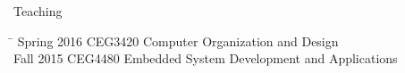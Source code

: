 
\begin{rSection}{Teaching}
\begin{tabbing}
\hspace{1.0in}\= \kill
    Spring 2016  \>  CEG3420 Computer Organization and Design \\
    Fall 2015    \>  CEG4480 Embedded System Development and Applications 
\end{tabbing}
\end{rSection}

